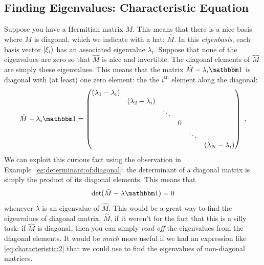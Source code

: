 \documentclass[12pt, oneside]{report}    %
\begin{document}
\subsection{Finding Eigenvalues: Characteristic Equation}

Suppose you have a Hermitian matrix $M$. This means that there is a nice basis where $M$ is diagonal, which we indicate with a hat: $\hat M$. In this \emph{eigenbasis}, each basis vector $\left|\xi_i\right\rangle$ has an associated eigenvalue $\lambda_i$. Suppose that none of the eigenvalues are zero so that $\hat M$ is nice and invertible. The diagonal elements of $\hat M$ are simply these eigenvalues. This means that the matrix $\hat M - \lambda_i \one$ is diagonal with (at least) one zero element: the the $i^\text{th}$ element along the diagonal:
\begin{align}
\hat M -\lambda_i\one = 
    \begin{pmatrix}
        (\lambda_1 - \lambda_i) & & & && \\
         & (\lambda_2 - \lambda_i) & & && \\
         & & \ddots &&& \\
         & & & 0 & & \\
         & & && \ddots & \\
         & & &&& (\lambda_N-\lambda_i)
    \end{pmatrix} \ .
    \label{eq:characteristic:1}
\end{align} 
We can exploit this curious fact using the observation in Example~\ref{eg:determinant:of:diagonal}: the determinant of a diagonal matrix is simply the product of its diagonal elements. This means that
\begin{align}
     \det(\hat M - \lambda \one) = 0
     \label{eq:characteristic:2}
\end{align}
whenever $\lambda$ is an eigenvalue of $\hat M$. This would be a great way to find the eigenvalues of diagonal matrix, $\hat M$, if it weren't for the fact that this is a silly task: if $\hat M$ is diagonal, then you can simply \emph{read off} the eigenvalues from the diagonal elements. It would be \emph{much} more useful if we had an expression like \eqref{eq:characteristic:2} that we could use to find the eigenvalues of non-diagonal matrices.  
\end{document}
